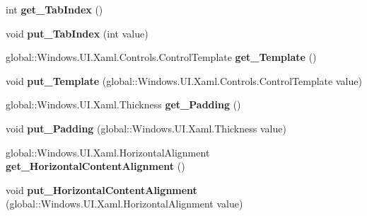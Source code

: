 \begin{DoxyCompactItemize}
int {\bfseries get\+\_\+\+Tab\+Index} ()
\item 
\mbox{\label{interface_windows_1_1_u_i_1_1_xaml_1_1_controls_1_1_i_control_a18bbebda6a6cee0159bb14a9ac6ee66f}} 
void {\bfseries put\+\_\+\+Tab\+Index} (int value)
\item 
\mbox{\label{interface_windows_1_1_u_i_1_1_xaml_1_1_controls_1_1_i_control_a81ca470482b238153cd3f15d30056ed8}} 
global\+::\+Windows.\+U\+I.\+Xaml.\+Controls.\+Control\+Template {\bfseries get\+\_\+\+Template} ()
\item 
\mbox{\label{interface_windows_1_1_u_i_1_1_xaml_1_1_controls_1_1_i_control_a47a20a386ef872f62d75cd4371bdc883}} 
void {\bfseries put\+\_\+\+Template} (global\+::\+Windows.\+U\+I.\+Xaml.\+Controls.\+Control\+Template value)
\item 
\mbox{\label{interface_windows_1_1_u_i_1_1_xaml_1_1_controls_1_1_i_control_a452993e07931c19d328c465e2fbf9c1b}} 
global\+::\+Windows.\+U\+I.\+Xaml.\+Thickness {\bfseries get\+\_\+\+Padding} ()
\item 
\mbox{\label{interface_windows_1_1_u_i_1_1_xaml_1_1_controls_1_1_i_control_a0cb6fa986bebae13f4ec72989952a80f}} 
void {\bfseries put\+\_\+\+Padding} (global\+::\+Windows.\+U\+I.\+Xaml.\+Thickness value)
\item 
\mbox{\label{interface_windows_1_1_u_i_1_1_xaml_1_1_controls_1_1_i_control_ab7063d3439567f73075e2c9561509b3a}} 
global\+::\+Windows.\+U\+I.\+Xaml.\+Horizontal\+Alignment {\bfseries get\+\_\+\+Horizontal\+Content\+Alignment} ()
\item 
\mbox{\label{interface_windows_1_1_u_i_1_1_xaml_1_1_controls_1_1_i_control_aa4cc459384bbe6c700e3a0f0b23f633e}} 
void {\bfseries put\+\_\+\+Horizontal\+Content\+Alignment} (global\+::\+Windows.\+U\+I.\+Xaml.\+Horizontal\+Alignment value)
\item 

\end{DoxyCompactItemize}
